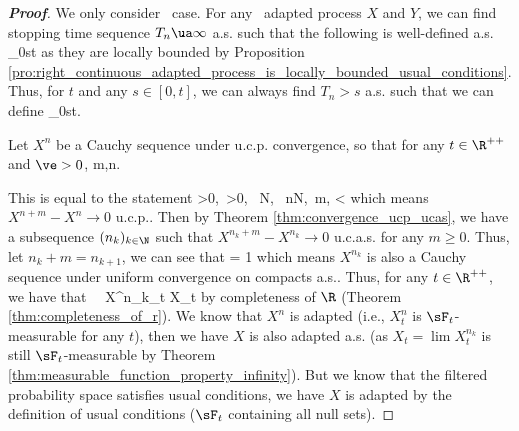 \begin{proof}[\bf Proof]
We only consider \cadlag\ case. For any \cadlag\ adapted process $X$ and $Y$, we can find stopping time sequence $T_n\ua \infty$ a.s. such that the following is well-defined a.s.
\be
\sup_{0\leq s\leq t}%
\ee
as they are locally bounded by Proposition \ref{pro:right_continuous_adapted_process_is_locally_bounded_usual_conditions}. Thus, for $t$ and any $s\in [0,t]$, we can always find $T_n > s$ a.s. such that we can define
\be
\sup_{0\leq s\leq t}\quad{}.
\ee

Let $X^n$ be a Cauchy sequence under u.c.p. convergence, so that for any $t\in \R^{++}$ and $\ve >0$,
\be
\pro{} \quad {}m,n\to \infty. %
\ee

This is equal to the statement
\be
\forall \ve>0,\ \delta>0, \ \exists N, \ \forall n\geq N,\ \forall m,\quad \pro{} < \delta
\ee
which means $X^{n+m} - X^n \to 0$ u.c.p.. Then by Theorem \ref{thm:convergence_ucp_ucas}, we have a subsequence $(n_k)_{k\in \N}$ such that $X^{n_k+m}-X^{n_k} \to 0$ u.c.a.s. for any $m\geq 0$. Thus, let $n_k+m = n_{k+1}$, we can see that
\be
\pro{} = 1
\ee
which means $X^{n_k}$ is also a Cauchy sequence under uniform convergence on compacts a.s.. %
Thus, for any $t\in \R^{++}$, we have that
\be
{}  \ \ra \ X^{n_k}_t \to X_t
\ee
by completeness of $\R$ (Theorem \ref{thm:completeness_of_r}). We know that $X^n$ is adapted (i.e., $X^n_t$ is $\sF_t$-measurable for any $t$), then we have $X$ is also adapted a.s. (as $X_t = \lim X^{n_k}_t$ is still $\sF_t$-measurable by Theorem \ref{thm:measurable_function_property_infinity}). But we know that the filtered probability space satisfies usual conditions, we have $X$ is adapted by the definition of usual conditions ($\sF_t$ containing all null sets).


\end{proof}
